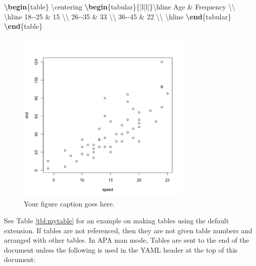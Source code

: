 \documentclass[man,longtable,noextraspace,floatsintext]{apa6}
\newenvironment{Shaded}{}{}
\newcommand{\ExtensionTok}[1]{#1}
\newcommand{\FunctionTok}[1]{\textcolor[rgb]{0.02,0.16,0.49}{#1}}
\newcommand{\KeywordTok}[1]{\textcolor[rgb]{0.00,0.44,0.13}{\textbf{#1}}}
\newcommand{\NormalTok}[1]{#1}
\newcommand{\OperatorTok}[1]{\textcolor[rgb]{0.40,0.40,0.40}{#1}}
\begin{document}
\begin{Shaded}
\begin{Highlighting}[]
\KeywordTok{\textbackslash{}begin}\NormalTok{\{}\ExtensionTok{table}\NormalTok{\}}
\FunctionTok{\textbackslash{}centering}
\KeywordTok{\textbackslash{}begin}\NormalTok{\{}\ExtensionTok{tabular}\NormalTok{\}\{|l|l|\}}\FunctionTok{\textbackslash{}hline}
\NormalTok{Age }\OperatorTok{\&}\NormalTok{ Frequency }\FunctionTok{\textbackslash{}\textbackslash{}} \FunctionTok{\textbackslash{}hline}
\NormalTok{18{-}{-}25  }\OperatorTok{\&}\NormalTok{ 15 }\FunctionTok{\textbackslash{}\textbackslash{}}
\NormalTok{26{-}{-}35  }\OperatorTok{\&}\NormalTok{ 33 }\FunctionTok{\textbackslash{}\textbackslash{}}
\NormalTok{36{-}{-}45  }\OperatorTok{\&}\NormalTok{ 22 }\FunctionTok{\textbackslash{}\textbackslash{}} \FunctionTok{\textbackslash{}hline}
\KeywordTok{\textbackslash{}end}\NormalTok{\{}\ExtensionTok{tabular}\NormalTok{\}}
\KeywordTok{\textbackslash{}end}\NormalTok{\{}\ExtensionTok{table}\NormalTok{\}}
\end{Highlighting}
\end{Shaded}

\begin{figure}
\hypertarget{fig:myplot}{%
\centering
\includegraphics[width=3.333in,height=3.333in]{plot.png}
\caption{Your figure caption goes here.}\label{fig:myplot}
}
\end{figure}

See Table \ref{tbl:mytable} for an example on making tables using the
default extension. If tables are not referenced, then they are not given
table numbers and arranged with other tables. In APA man mode, Tables
are sent to the end of the document unless the following is used in the
YAML header at the top of this document:
\end{document}
